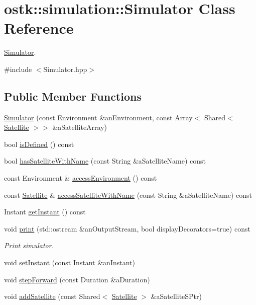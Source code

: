 \hypertarget{classostk_1_1simulation_1_1_simulator}{}\section{ostk\+:\+:simulation\+:\+:Simulator Class Reference}
\label{classostk_1_1simulation_1_1_simulator}


\hyperlink{classostk_1_1simulation_1_1_simulator}{Simulator}.  




{\ttfamily \#include $<$Simulator.\+hpp$>$}

\subsection*{Public Member Functions}
\begin{DoxyCompactItemize}
\item 
\hyperlink{classostk_1_1simulation_1_1_simulator_a6c69bdb82f84e62d0e006755d501e05a}{Simulator} (const Environment \&an\+Environment, const Array$<$ Shared$<$ \hyperlink{classostk_1_1simulation_1_1_satellite}{Satellite} $>$$>$ \&a\+Satellite\+Array)
\item 
bool \hyperlink{classostk_1_1simulation_1_1_simulator_a666148ccdc39474edbe83e7ffc65bac1}{is\+Defined} () const
\item 
bool \hyperlink{classostk_1_1simulation_1_1_simulator_a055842428d08ac13305da1b3ad339568}{has\+Satellite\+With\+Name} (const String \&a\+Satellite\+Name) const
\item 
const Environment \& \hyperlink{classostk_1_1simulation_1_1_simulator_aa1c20421b7a2ad00954fea7bdfbd4edd}{access\+Environment} () const
\item 
const \hyperlink{classostk_1_1simulation_1_1_satellite}{Satellite} \& \hyperlink{classostk_1_1simulation_1_1_simulator_ada54ce66cb47bb512f245f4ac1b33f95}{access\+Satellite\+With\+Name} (const String \&a\+Satellite\+Name) const
\item 
Instant \hyperlink{classostk_1_1simulation_1_1_simulator_a64483af631b1f905850bb8b366f6fb0a}{get\+Instant} () const
\item 
void \hyperlink{classostk_1_1simulation_1_1_simulator_a820c217ea08c035aa3b171112998b334}{print} (std\+::ostream \&an\+Output\+Stream, bool display\+Decorators=true) const
\begin{DoxyCompactList}\small\item\em Print simulator. \end{DoxyCompactList}\item 
void \hyperlink{classostk_1_1simulation_1_1_simulator_ab5fb0cb4864bbbbb35b3ab65d76d0a84}{set\+Instant} (const Instant \&an\+Instant)
\item 
void \hyperlink{classostk_1_1simulation_1_1_simulator_acb6015e28195acde22acc04ff2e8b8a8}{step\+Forward} (const Duration \&a\+Duration)
\item 
void \hyperlink{classostk_1_1simulation_1_1_simulator_a03e47de54e6db4942b77d24c46dcc940}{add\+Satellite} (const Shared$<$ \hyperlink{classostk_1_1simulation_1_1_satellite}{Satellite} $>$ \&a\+Satellite\+S\+Ptr)
\end{DoxyCompactItemize}
